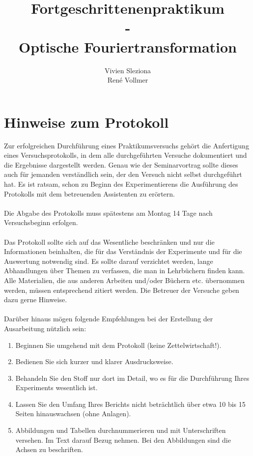 \documentclass[10pt,a4paper]{article}
\begin{document}

\title{Fortgeschrittenenpraktikum\\ -\\ Optische Fouriertransformation }
\author{Vivien Sleziona \\ René Vollmer}

\maketitle
\newpage

\tableofcontents
\vfill
\newpage


\section{Hinweise zum Protokoll}

Zur erfolgreichen Durchführung eines Praktikumsversuchs gehört die Anfertigung eines Versuchsprotokolls, in dem alle durchgeführten Versuche dokumentiert und die Ergebnisse dargestellt werden. Genau wie der Seminarvortrag sollte dieses auch für jemanden verständlich sein, der den Versuch nicht selbst durchgeführt hat. Es ist ratsam, schon zu Beginn des Experimentierens die Ausführung des Protokolls mit dem betreuenden Assistenten zu erörtern.\\
\\
Die Abgabe des Protokolls muss spätestens am Montag 14 Tage nach Versuchsbeginn erfolgen.\\
\\
Das Protokoll sollte sich auf das Wesentliche beschränken und nur die Informationen beinhalten, die für das Verständnis der Experimente und für die Auswertung notwendig sind. Es sollte darauf verzichtet werden, lange Abhandlungen über Themen zu verfassen, die man in Lehrbüchern finden kann. Alle Materialien, die aus anderen Arbeiten und/oder Büchern etc. übernommen werden, müssen entsprechend zitiert werden. Die Betreuer der Versuche geben dazu gerne Hinweise.\\
\\
Darüber hinaus mögen folgende Empfehlungen bei der Erstellung der Ausarbeitung nützlich sein:\\
\begin{enumerate}
\item Beginnen Sie umgehend mit dem Protokoll (keine Zettelwirtschaft!).
\item Bedienen Sie sich kurzer und klarer Ausdrucksweise.
\item Behandeln Sie den Stoff nur dort im Detail, wo es für die Durchführung Ihres Experiments wesentlich ist.
\item Lassen Sie den Umfang Ihres Berichts nicht beträchtlich über etwa 10 bis 15 Seiten hinauswachsen (ohne Anlagen).
\item Abbildungen und Tabellen durchnummerieren und mit Unterschriften versehen. Im Text darauf Bezug nehmen. Bei den Abbildungen sind die Achsen zu beschriften. 
\end{enumerate}
\end{document}

